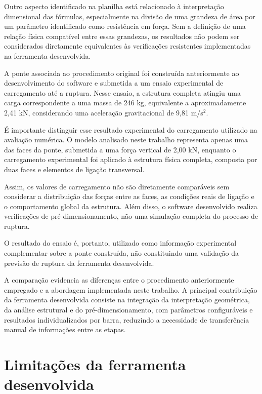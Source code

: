 Outro aspecto identificado na planilha está relacionado à interpretação dimensional das fórmulas, especialmente na divisão de uma grandeza de área por um parâmetro identificado como resistência em força. Sem a definição de uma relação física compatível entre essas grandezas, os resultados não podem ser considerados diretamente equivalentes às verificações resistentes implementadas na ferramenta desenvolvida.

A ponte associada ao procedimento original foi construída anteriormente ao desenvolvimento do software e submetida a um ensaio experimental de carregamento até a ruptura. Nesse ensaio, a estrutura completa atingiu uma carga correspondente a uma massa de 246 kg, equivalente a aproximadamente 2,41 kN, considerando uma aceleração gravitacional de 9,81 m/s$^2$.

É importante distinguir esse resultado experimental do carregamento utilizado na avaliação numérica. O modelo analisado neste trabalho representa apenas uma das faces da ponte, submetida a uma força vertical de 2,00 kN, enquanto o carregamento experimental foi aplicado à estrutura física completa, composta por duas faces e elementos de ligação transversal.

Assim, os valores de carregamento não são diretamente comparáveis sem considerar a distribuição das forças entre as faces, as condições reais de ligação e o comportamento global da estrutura. Além disso, o software desenvolvido realiza verificações de pré-dimensionamento, não uma simulação completa do processo de ruptura.

O resultado do ensaio é, portanto, utilizado como informação experimental complementar sobre a ponte construída, não constituindo uma validação da previsão de ruptura da ferramenta desenvolvida.

A comparação evidencia as diferenças entre o procedimento anteriormente empregado e a abordagem implementada neste trabalho. A principal contribuição da ferramenta desenvolvida consiste na integração da interpretação geométrica, da análise estrutural e do pré-dimensionamento, com parâmetros configuráveis e resultados individualizados por barra, reduzindo a necessidade de transferência manual de informações entre as etapas.

\section{Limitações da ferramenta desenvolvida}
\label{sec:resultados-limitacoes}

